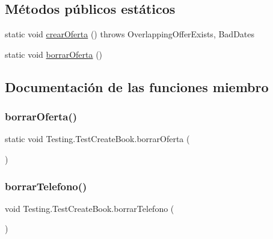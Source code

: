 \subsection*{Métodos públicos estáticos}
\begin{DoxyCompactItemize}
\item 
static void \mbox{\hyperlink{class_testing_1_1_test_create_book_a36cdebeb27b2395e4c28724a1455a27f}{crear\+Oferta}} ()  throws Overlapping\+Offer\+Exists, Bad\+Dates 
\item 
static void \mbox{\hyperlink{class_testing_1_1_test_create_book_a34497f1cf0ff53a875e40ad07f52e0d2}{borrar\+Oferta}} ()
\end{DoxyCompactItemize}


\subsection{Documentación de las funciones miembro}
\mbox{\label{class_testing_1_1_test_create_book_a34497f1cf0ff53a875e40ad07f52e0d2}} 
\subsubsection{\texorpdfstring{borrarOferta()}{borrarOferta()}}
{\footnotesize\ttfamily static void Testing.\+Test\+Create\+Book.\+borrar\+Oferta (\begin{DoxyParamCaption}{ }\end{DoxyParamCaption})\hspace{0.3cm}{\ttfamily [static]}}

\mbox{\label{class_testing_1_1_test_create_book_a22b7be219ee185ba9d0c8c8d1703ba7a}} 
\subsubsection{\texorpdfstring{borrarTelefono()}{borrarTelefono()}}
{\footnotesize\ttfamily void Testing.\+Test\+Create\+Book.\+borrar\+Telefono (\begin{DoxyParamCaption}{ }\end{DoxyParamCaption})}

